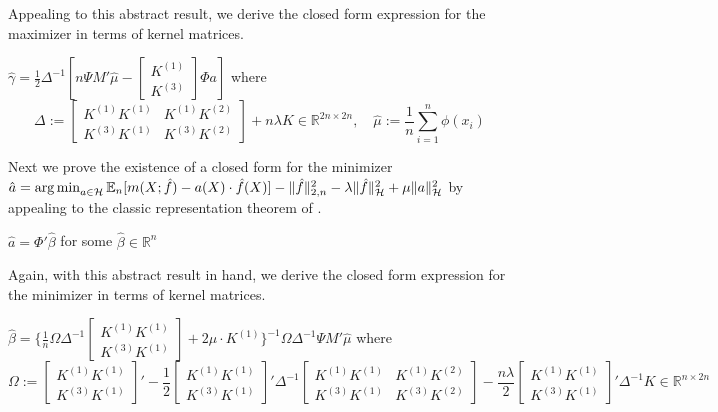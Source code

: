 Appealing to this abstract result, we derive the closed form expression for the maximizer in terms of kernel matrices.

\begin{proposition}\label{prop:closed1}
$\hat{\gamma}=\frac{1}{2}\Delta^{-1}\left[n\Psi M' \hat{\mu} -\begin{bmatrix}K^{(1)} \\ K^{(3)} \end{bmatrix}\Phi a\right]$ 
where
$$ \Delta:=\begin{bmatrix} K^{(1)}K^{(1)} & K^{(1)} K^{(2)} \\ K^{(3)} K^{(1)} & K^{(3)}K^{(2)}\end{bmatrix}+n\lambda K\in\mathbb{R}^{2n\times 2n},\quad \hat{\mu}:=\frac{1}{n}\sum_{i=1}^n \phi(x_i)$$
\end{proposition}

%

Next we prove the existence of a closed form for the minimizer $\hat{a}=\operatorname*{arg\,min}_{a\in\mathcal{H}} \mathbb{E}_n[m(X;\hat{f}) - a(X)\cdot \hat{f}(X)] - \|\hat{f}\|_{2,n}^2 - \lambda \|\hat{f}\|_{{\mathcal H}}^2 + \mu \|a\|_{{\mathcal H}}^2$ by appealing to the classic representation theorem of \cite{kimeldorf1971some,scholkopf2001generalized}.

\begin{proposition}\label{prop:rep2}
$\hat{a}=\Phi'\hat{\beta}$ for some $\hat{\beta}\in\mathbb{R}^n$
\end{proposition}

Again, with this abstract result in hand, we derive the closed form expression for the minimizer in terms of kernel matrices.

\begin{proposition}\label{prop:closed2}
$\hat{\beta}=\bigg\{
       \frac{1}{n}\Omega  \Delta^{-1}
        \begin{bmatrix} K^{(1)} K^{(1)} \\ K^{(3)} K^{(1)}\end{bmatrix}
    +2\mu\cdot K^{(1)}\bigg\}^{-1}\Omega\Delta^{-1}\Psi M'\hat{\mu}$
    where
    $$
 \Omega:=\begin{bmatrix}K^{(1)}K^{(1)} \\ K^{(3)}K^{(1)} \end{bmatrix}'
%
-\frac{1}{2}\begin{bmatrix}K^{(1)}K^{(1)} \\ K^{(3)}K^{(1)} \end{bmatrix}'    
\Delta^{-1}
       \begin{bmatrix} K^{(1)}K^{(1)} & K^{(1)} K^{(2)} \\ K^{(3)} K^{(1)} & K^{(3)}K^{(2)}\end{bmatrix}
        -\frac{n\lambda}{2}\begin{bmatrix}K^{(1)}K^{(1)} \\ K^{(3)}K^{(1)} \end{bmatrix}' \Delta^{-1}K \in\mathbb{R}^{n\times 2n}
    $$
\end{proposition}

